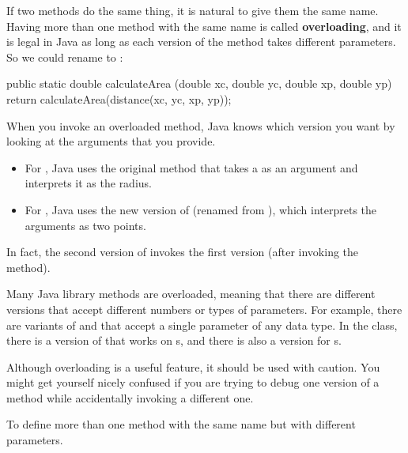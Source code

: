 
If two methods do the same thing, it is natural to give them the same name.
Having more than one method with the same name is called {\bf overloading}, and it is legal in Java as long as each version of the method takes different parameters.
So we could rename  to :

\begin{code}
public static double calculateArea
        (double xc, double yc, double xp, double yp) {
    return calculateArea(distance(xc, yc, xp, yp));
}
\end{code}

When you invoke an overloaded method, Java knows which version you want by looking at the arguments that you provide.

\begin{itemize}

\item For , Java uses the original  method that takes a  as an argument and interprets it as the radius.

\item For , Java uses the new version of  (renamed from ), which interprets the arguments as two points.

\end{itemize}

In fact, the second version of  invokes the first version (after invoking the  method).

Many Java library methods are overloaded, meaning that there are different versions that accept different numbers or types of parameters.
For example, there are variants of  and  that accept a single parameter of any data type.
In the  class, there is a version of  that works on s, and there is also a version for s.

Although overloading is a useful feature, it should be used with caution.
You might get yourself nicely confused if you are trying to debug one version of a method while accidentally invoking a different one.


\begin{description}

To define more than one method with the same name but with different parameters.

\end{description}


